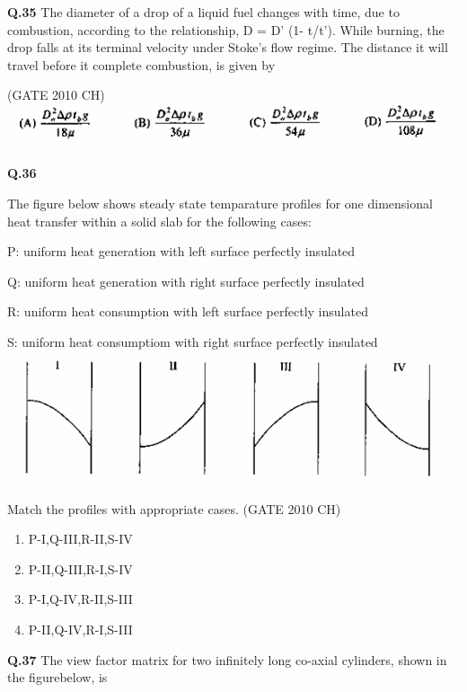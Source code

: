 \documentclass[journal,12pt,onecolumn]{exam}
\theoremstyle{remark}
\begin{document}
 \noindent
 \textbf{Q.35}
  The diameter of a drop of a liquid fuel changes with time, due to combustion, according to the relationship, D = D' (1- t/t'). While burning, the drop falls at its terminal velocity under Stoke's flow regime. The distance it will travel before it complete combustion, is given by
 
 \hfill{(GATE 2010 CH)}\\

\includegraphics[width=1.0\linewidth]{images/Q.35 options.png}
    
 
\noindent
\textbf{Q.36}
 
 The figure below shows steady state temparature profiles for one dimensional heat transfer within a solid slab for the following cases:

  P: uniform heat generation    with left surface perfectly insulated
  
  Q: uniform heat generation    with right surface perfectly insulated
  
   R: uniform heat consumption    with left surface perfectly insulated
   
   S: uniform heat consumptiom    with right surface perfectly insulated \\
   \includegraphics[width=1.0\linewidth]{images/Q.36 image.png}
    
    Match the profiles with appropriate cases.
\hfill{(GATE 2010 CH)}\\

   \begin{enumerate}
    \item P-I,Q-III,R-II,S-IV
    \item P-II,Q-III,R-I,S-IV
    \item P-I,Q-IV,R-II,S-III
    \item P-II,Q-IV,R-I,S-III
   \end{enumerate}

   \noindent
   \textbf{Q.37}
    The view factor matrix for two infinitely long co-axial cylinders, shown in the figurebelow, is
\end{document}
